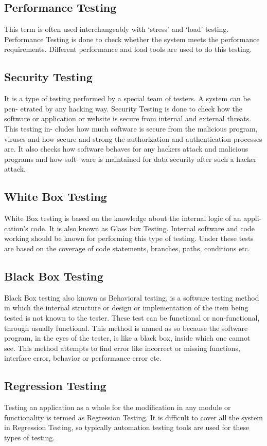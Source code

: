 \documentclass[oneside,a4paper,12pt]{report}
\begin{document}
{\subsection{Performance Testing}
This term is often used interchangeably with ‘stress’ and ‘load’ testing. Performance Testing is done to check whether the system meets the performance requirements. Different performance and load tools are used to do this testing.
\subsection{Security Testing}
It is a type of testing performed by a special team of testers. A system can be pen- etrated by any hacking way. Security Testing is done to check how the software or application or website is secure from internal and external threats. This testing in- cludes how much software is secure from the malicious program, viruses and how secure and strong the authorization and authentication processes are. It also checks how software behaves for any hackers attack and malicious programs and how soft- ware is maintained for data security after such a hacker attack.
\subsection{White Box Testing}
White Box testing is based on the knowledge about the internal logic of an appli- cation’s code. It is also known as Glass box Testing. Internal software and code working should be known for performing this type of testing. Under these tests are based on the coverage of code statements, branches, paths, conditions etc.

\subsection{Black Box Testing}
Black Box testing also known as Behavioral testing, is a software testing method  in which the internal structure or design or implementation of the item being tested is not known to the tester. These test can be functional or non-functional, through usually functional. This method is named as so because the software program, in the eyes of the tester, is like a black box, inside which one cannot see. This method attempts to find error like incorrect or missing functions, interface error, behavior or performance error etc.
\subsection{Regression Testing}
Testing an application as a whole for the modification in any module or functionality is termed as Regression Testing. It is difficult to cover all the system in Regression Testing, so typically automation testing tools are used for these types of testing.
}
\end{document}
